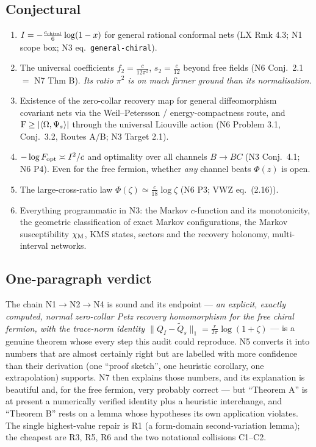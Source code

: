\documentclass[11pt]{article}
\newcommand{\NI}{N1}\newcommand{\NII}{N2}\newcommand{\NIII}{N3}
\newcommand{\NIV}{N4}\newcommand{\NV}{N5}\newcommand{\NVI}{N6}\newcommand{\NVII}{N7}
\newcommand{\CMI}{I}
\newcommand{\zz}{\zeta}
\begin{document}
\subsection{Conjectural}
\begin{enumerate}[leftmargin=1.7em]
\item[C1.] $\CMI=-\frac{c_{\rm chiral}}6\log(1-x)$ for general rational conformal nets (LX Rmk 4.3;
\NI{} scope box; \NIII{} eq.~\texttt{general-\allowbreak chiral}).
\item[C2.] The universal coefficients $f_2=\frac c{12\pi^2}$, $s_2=\frac c{12}$ beyond free fields
(\NVI{} Conj.~2.1 $=$ \NVII{} Thm B).  \emph{Its ratio $\pi^2$ is on much firmer ground than its normalisation.}
\item[C3.] Existence of the zero-collar recovery map for general diffeomorphism covariant nets via the
Weil--Petersson / energy-compactness route, and $\operatorname{F}\ge|\langle\Omega,\Psi_s\rangle|$ through the universal Liouville
action (\NVI{} Problem 3.1, Conj.~3.2, Routes A/B; \NIII{} Target 2.1).
\item[C4.] $-\log F_{\rm opt}\asymp\CMI^2/c$ and optimality over all channels $B\to BC$
(\NIII{} Conj.~4.1; \NVI{} P4).  Even for the free fermion, whether \emph{any} channel beats $\Phi(z)$ is open.
\item[C5.] The large-cross-ratio law $\Phi(\zz)\simeq\frac c{18}\log\zz$ (\NVI{} P3; VWZ eq.~(2.16)).
\item[C6.] Everything programmatic in \NIII: the Markov $c$-function and its monotonicity, the geometric
classification of exact Markov configurations, the Markov susceptibility $\chi_{\rm M}$, KMS states, sectors and the
recovery holonomy, multi-interval networks.
\end{enumerate}

\subsection{One-paragraph verdict}
The chain \NI$\to$\NII$\to$\NIV{} is sound and its endpoint --- \emph{an explicit, exactly computed, normal zero-collar
Petz recovery homomorphism for the free chiral fermion, with the trace-norm identity
$\|Q_I-\widetilde Q_s\|_1=\frac r{2\pi}\log(1+\zz)$} --- is a genuine theorem whose every step this audit could
reproduce.  \NV{} converts it into numbers that are almost certainly right but are labelled with more confidence than
their derivation (one ``proof sketch'', one heuristic corollary, one extrapolation) supports.  \NVII{} then explains
those numbers, and its explanation is beautiful and, for the free fermion, very probably correct --- but ``Theorem A''
is at present a numerically verified identity plus a heuristic interchange, and ``Theorem B'' rests on a lemma whose
hypotheses its own application violates.  The single highest-value repair is R1 (a form-domain second-variation lemma);
the cheapest are R3, R5, R6 and the two notational collisions C1--C2.
\end{document}
